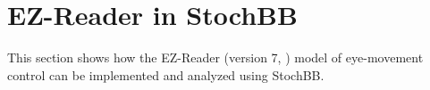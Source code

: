 \section{EZ-Reader in StochBB}
This section shows how the EZ-Reader (version 7, \cite{Reichle2003}) model of eye-movement control can be implemented and analyzed 
using StochBB.
